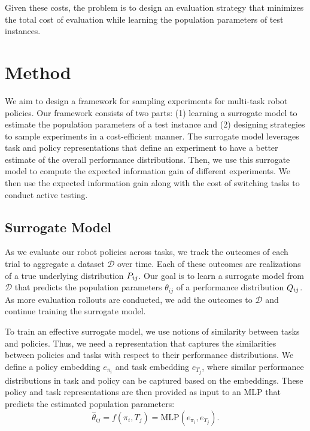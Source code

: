 Given these costs, the problem is to design an evaluation strategy that minimizes the total cost of evaluation while learning the population parameters of test instances.




\section{Method}

We aim to design a framework for sampling experiments for multi-task robot policies.
Our framework consists of two parts: (1) learning a surrogate model to estimate the population parameters of a test instance and (2) designing strategies to sample experiments in a cost-efficient manner.
The surrogate model leverages task and policy representations that define an experiment to have a better estimate of the overall performance distributions.
Then, we use this surrogate model to compute the expected information gain of different experiments.
We then use the expected information gain along with the cost of switching tasks to conduct active testing.

\subsection{Surrogate Model}
As we evaluate our robot policies across tasks, we track the outcomes of each trial to aggregate a dataset $\mathcal{D}$ over time.
Each of these outcomes are realizations of a true underlying distribution $P_{ij}$.
Our goal is to learn a surrogate model from $\mathcal{D}$ that predicts the population parameters $\theta_{ij}$ of a performance distribution  $Q_{ij}$. 
As more evaluation rollouts are conducted, we add the outcomes to $\mathcal{D}$ and continue training the surrogate model.

To train an effective surrogate model,  we use notions of similarity between tasks and policies. 
Thus, we need a representation that captures the similarities between policies and tasks with respect to their performance distributions.
We define a policy embedding $e_{\pi_i}$ and task embedding $e_{T_j}$, where similar performance distributions in task and policy can be captured based on the embeddings.
These policy and task representations are then provided as input to an MLP that predicts the estimated population parameters:
\begin{equation}
    \hat{\theta}_{ij} = f(\pi_i, T_j) = \text{MLP}(e_{\pi_i}, e_{T_j}).
\end{equation}

